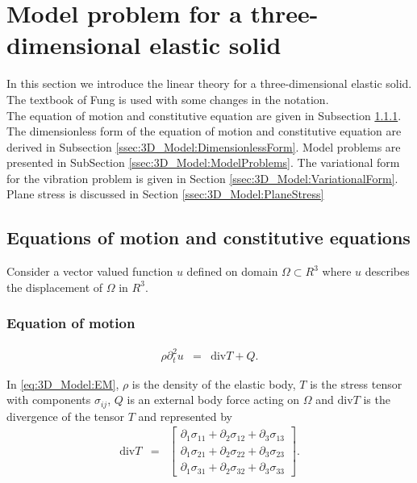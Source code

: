 \documentclass[../../main.tex]{subfiles}ite{VS18}
\begin{document}
\section{Model problem for a three-dimensional elastic solid} \label{sec:3D_Model}
In this section we introduce the linear theory for a three-dimensional elastic
solid. The textbook of Fung \cite{Fung65} is used with some changes in the
notation. \\

The equation of motion and constitutive equation are given in Subsection
\ref{ssec:3D_Model:EquationOfMotion}. The dimensionless form of the equation of
motion and constitutive equation are derived in Subsection
\ref{ssec:3D_Model:DimensionlessForm}. Model problems are presented in
SubSection \ref{ssec:3D_Model:ModelProblems}. The variational form for the
vibration problem is given in Section \ref{ssec:3D_Model:VariationalForm}.
Plane stress is discussed in Section \ref{ssec:3D_Model:PlaneStress}

\subsection{Equations of motion and constitutive equations} \label{ssec:3D_Model:EquationofMotion+ConstitutiveEquation}
Consider a vector valued function $u$ defined on domain $\Omega \subset {R}^3$ \label{sym:Omega} \label{sym:Rn}
where $u$\label{sym:u} describes the displacement of $\Omega$ in ${R}^3$.
\subsubsection{Equation of motion}\label{ssec:3D_Model:EquationOfMotion}
\begin{eqnarray}
	\rho\partial_t^2 u & = & \textrm{div}T + Q. \label{eq:3D_Model:EM}
\end{eqnarray} \label{sym:rho} \label{sym:partial_diff} \label{sym:T} \label{sym:Q}

In \eqref{eq:3D_Model:EM}, $\rho$ is the density of the elastic body, $T$ is
the stress tensor with components $\sigma_{ij}$\label{sym:sigmaij}, $Q$ is an external body force
acting on $\Omega$ and $\textrm{div}T$\label{sym:divT} is the divergence of the tensor $T$ and
represented by
\begin{eqnarray}
	\textrm{div}  T & = &
	\begin{bmatrix}
		\partial_1 \sigma_{11} + \partial_2 \sigma_{12} + \partial_3 \sigma_{13} \\
		\partial_1 \sigma_{21} + \partial_2 \sigma_{22} + \partial_3 \sigma_{23} \\
		\partial_1 \sigma_{31} + \partial_2 \sigma_{32} + \partial_3 \sigma_{33}
	\end{bmatrix}. \label{eq:3D_Model:divT}
\end{eqnarray}
\end{document}
